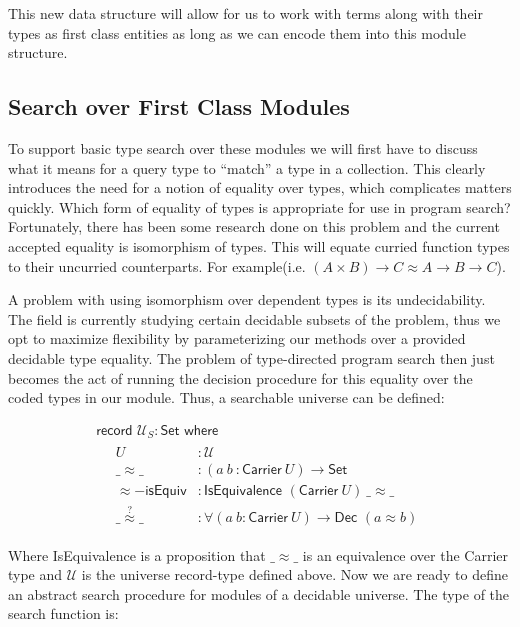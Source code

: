 \documentclass[acmsmall,review,authorversion]{acmart}
\newcommand{\term}[1]{\textsf{#1}}
\newcommand{\type}[1]{\textsf{#1}}
\newcommand{\Carrier}{\term{Carrier}}
\newcommand{\Universe}{\mathcal{U}}
\newcommand{\Set}{\type{Set}}
\newcommand{\?}{\stackrel{?}{\approx}}
\newcommand{\record}[2]{\textsf{record } #1 : #2 \textsf{ where}}
\begin{document}
This new data structure will allow for us to work with terms along with their
types as first class entities as long as we can encode them into this module
structure.


\subsection{Search over First Class Modules}


To support basic type search over these modules we will first have to discuss
what it means for a query type to ``match'' a type in a collection. This clearly
introduces the need for a notion of equality over types, which complicates
matters quickly. Which form of equality of types is appropriate for use in
program search? Fortunately, there has been some research done on this problem
and the current accepted equality is isomorphism of
types\cite{dicosmo2012isomorphisms}. This will equate curried function types to
their uncurried counterparts. For example(i.e. $(A \times B) \rightarrow C
\approx A \rightarrow B \rightarrow C$).

A problem with using isomorphism over dependent types is its
undecidability\cite{HoTT}. The field is currently studying certain decidable
subsets of the problem, thus we opt to maximize flexibility by parameterizing
our methods over a provided decidable type equality. The problem of
type-directed program search then just becomes the act of running the decision
procedure for this equality over the coded types in our module. Thus, a
searchable universe can be defined:

$$
\begin{array}{l}
  \record{\Universe_S}{\Set}\\
  \quad \begin{array}{ll}
          U &: \Universe\\
         \_\approx\_ &: (a\ b\ : \Carrier\ U) \rightarrow \Set\\
         \approx-\textsf{isEquiv} &: \textsf{IsEquivalence } (\Carrier\ U)\ \_\approx\_\\
         \_\?\_ &: \forall (a\ b : \Carrier\ U) \rightarrow \textsf{Dec } (a \approx b)
        \end{array}
\end{array}
$$

Where \textsf{IsEquivalence} is a proposition that $\_\approx\_$ is an
equivalence over the \textsf{Carrier} type and $\Universe$ is the universe
record-type defined above. Now we are ready to define an abstract search
procedure for modules of a decidable universe. The type of the search function
is:
\end{document}
